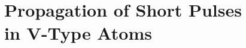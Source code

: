 \chapter[Propagation of Short Pulses in V-Type Atoms]
  {Propagation of Short Pulses\\ in V-Type Atoms}
  \label{chp:simultons}

  

  

  

  

  

  

  